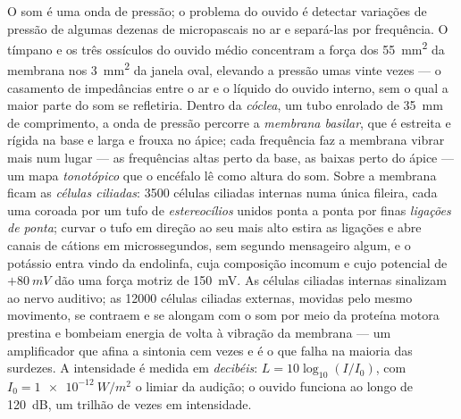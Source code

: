 \begin{definition}[A cóclea]\label{def:b3:sensory-systems:cochlea}
O som é uma onda de pressão; o problema do ouvido é detectar variações
de pressão de algumas dezenas de micropascais no ar e separá-las por
frequência. O tímpano e os três ossículos do ouvido médio concentram a
força dos \qty{55}{mm^2} da membrana nos \qty{3}{mm^2} da janela oval,
elevando a pressão umas vinte vezes --- o casamento de impedâncias
entre o ar e o líquido do ouvido interno, sem o qual a maior parte do
som se refletiria. Dentro da \emph{cóclea}, um tubo enrolado de
\qty{35}{mm} de comprimento, a onda de pressão percorre a \emph{membrana
basilar}, que é estreita e rígida na base e larga e frouxa no ápice;
cada frequência faz a membrana vibrar mais num lugar --- as frequências
altas perto da base, as baixas perto do ápice --- um mapa
\emph{tonotópico} que o encéfalo lê como altura do som. Sobre a
membrana ficam as \emph{células ciliadas}: \num{3500} células ciliadas
internas numa única fileira, cada uma coroada por um tufo de
\emph{estereocílios} unidos ponta a ponta por finas \emph{ligações de
ponta}; curvar o tufo em direção ao seu  mais alto estira as
ligações e abre canais de cátions em microssegundos, sem segundo
mensageiro algum, e o potássio entra vindo da endolinfa, cuja
composição incomum e cujo potencial de $+\qty{80}{mV}$ dão uma força
motriz de \qty{150}{mV}. As células ciliadas internas sinalizam ao
nervo auditivo; as \num{12000} células ciliadas externas, movidas pelo
mesmo movimento, se contraem e se alongam com o som por meio da
proteína motora prestina e bombeiam energia de volta à vibração da
membrana --- um amplificador que afina a sintonia cem vezes e é o que
falha na maioria das surdezes. A intensidade é medida em
\emph{decibéis}: $L = 10\log_{10}
(I/I_{0})$, com $I_{0} = \qty{1e-12}{W/m^2}$ o limiar da audição; o ouvido funciona ao longo de
\qty{120}{dB}, um trilhão de vezes em intensidade.
\end{definition}

